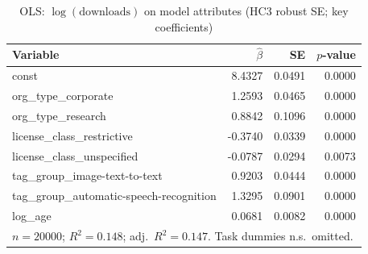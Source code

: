 \begin{table}[t]
\caption{OLS: $\log(\text{downloads})$ on model attributes (HC3 robust SE; key coefficients)}
\label{tab:ols}
\centering
\small
\begin{tabular}{lrrr}
\toprule
Variable & $\hat\beta$ & SE & $p$-value \\
\midrule
const & 8.4327 & 0.0491 & 0.0000 \\
org\_type\_corporate & 1.2593 & 0.0465 & 0.0000 \\
org\_type\_research & 0.8842 & 0.1096 & 0.0000 \\
license\_class\_restrictive & -0.3740 & 0.0339 & 0.0000 \\
license\_class\_unspecified & -0.0787 & 0.0294 & 0.0073 \\
tag\_group\_image-text-to-text & 0.9203 & 0.0444 & 0.0000 \\
tag\_group\_automatic-speech-recognition & 1.3295 & 0.0901 & 0.0000 \\
log\_age & 0.0681 & 0.0082 & 0.0000 \\
\bottomrule
\multicolumn{4}{l}{$n=20000$; $R^2=0.148$; adj.\ $R^2=0.147$. Task dummies n.s.\ omitted.} \\
\end{tabular}
\normalsize
\end{table}
